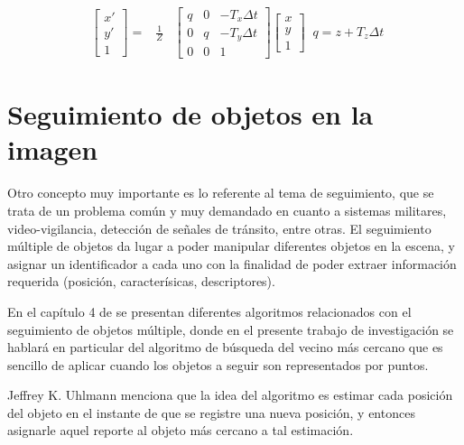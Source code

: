 \begin{equation}
    \label{equ:homografiaMatricialFinal}
    \begin{aligned}
        \left[\begin{array}{c}
        x'\\
        y'\\
        1
    \end{array}\right]=&\frac{1}{Z}&\left[\begin{array}{ccc}
    q & 0 & -T_x\Delta t\\
    0 & q & -T_y \Delta t\\
    0 & 0 & 1
    \end{array}\right]\left[\begin{array}{c}
         x\\
         y\\
         1
    \end{array}\right]
    \end{aligned}
    \hspace{2pt}
    q = z + T_z \Delta t
\end{equation}

\section{Seguimiento de objetos en la imagen}

Otro concepto muy importante es lo referente al tema de seguimiento, que se trata de un problema común y muy demandado en cuanto a sistemas militares, video-vigilancia, detección de señales de tránsito, entre otras. El seguimiento múltiple de objetos da lugar a poder manipular diferentes objetos en la escena, y asignar un identificador a cada uno con la finalidad de poder extraer información requerida (posición, caracterísicas, descriptores).

En el capítulo 4 de \citet{Waltz2008} se presentan diferentes algoritmos relacionados con el seguimiento de objetos múltiple, donde en el presente trabajo de investigación se hablará en particular del algoritmo de búsqueda del vecino más cercano que es sencillo de aplicar cuando los objetos a seguir son representados por puntos.

Jeffrey K. Uhlmann menciona que la idea del algoritmo es estimar cada posición del objeto en el instante de que se registre una nueva posición, y entonces asignarle aquel reporte al objeto más cercano a tal estimación.

